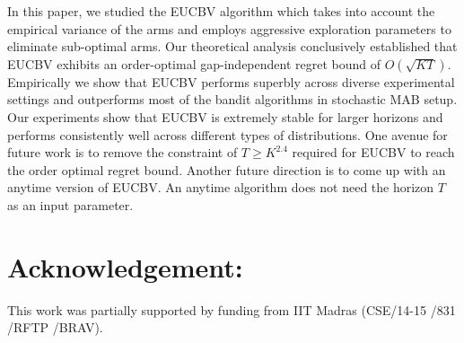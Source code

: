 In this paper, we studied the EUCBV algorithm which takes into account the empirical variance of the arms and employs aggressive exploration parameters to eliminate sub-optimal arms. Our theoretical analysis conclusively established that EUCBV exhibits an order-optimal gap-independent regret bound of $O\left(\sqrt{KT}\right)$. Empirically we show that EUCBV performs superbly across diverse experimental settings and outperforms most of the bandit algorithms in stochastic  MAB setup. Our experiments show that EUCBV is extremely stable for larger horizons and performs consistently well across different types of distributions. One avenue for future work is to remove the constraint of $T\geq K^{2.4}$ required for EUCBV to reach the order optimal regret bound. Another future direction is to come up with an anytime version of EUCBV. An anytime algorithm does not need the horizon $T$ as an input parameter.


\section*{Acknowledgement:} This work was partially supported by funding from IIT Madras (CSE/14-15 /831 /RFTP /BRAV).